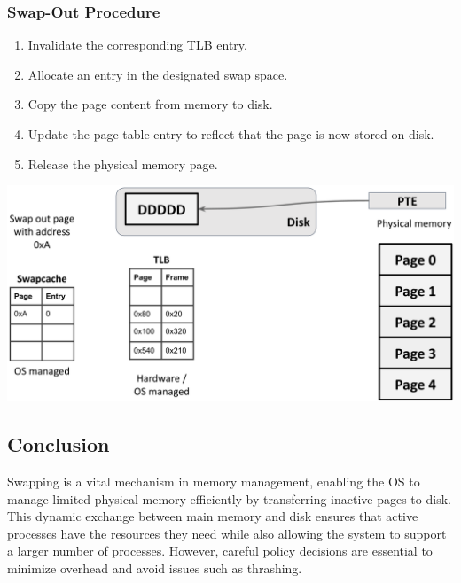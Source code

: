 \documentclass[../../compsys.tex]{subfiles}
\begin{document}
\subsubsection{Swap-Out Procedure}
\noindent
\begin{minipage}{0.45\textwidth}
\begin{enumerate}
    \item Invalidate the corresponding TLB entry.
    \item Allocate an entry in the designated swap space.
    \item Copy the page content from memory to disk.
    \item Update the page table entry to reflect that the page is now stored on disk.
    \item Release the physical memory page.
\end{enumerate}
\end{minipage}%
\hfill
\begin{minipage}{0.45\textwidth}
\begin{center}
  \includegraphics[width=1.1\textwidth]{chapters/L5/images/swapout.png}
\end{center}
\end{minipage}

\subsection{Conclusion}
Swapping is a vital mechanism in memory management, enabling the OS to manage limited physical memory efficiently by transferring inactive pages to disk. This dynamic exchange between main memory and disk ensures that active processes have the resources they need while also allowing the system to support a larger number of processes. However, careful policy decisions are essential to minimize overhead and avoid issues such as thrashing.
\end{document}

